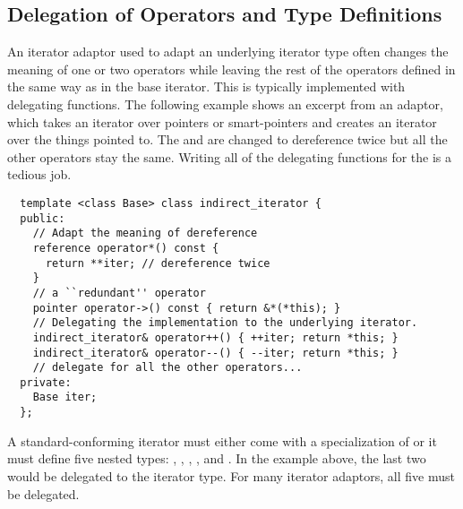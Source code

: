 \documentclass{netobjectdays}
\begin{document}
 


\subsection{Delegation of Operators and Type Definitions}

An iterator adaptor used to adapt an underlying iterator type often
changes the meaning of one or two operators while leaving the rest of
the operators defined in the same way as in the base iterator.  This
is typically implemented with delegating functions. The following
example shows an excerpt from an  adaptor,
which takes an iterator over pointers or smart-pointers and creates an
iterator over the things pointed to. The  and
 are changed to dereference twice but all the other
operators stay the same. Writing all of the delegating functions for
the  is a tedious job.

{\footnotesize
\begin{verbatim}
  template <class Base> class indirect_iterator {
  public:
    // Adapt the meaning of dereference
    reference operator*() const {
      return **iter; // dereference twice
    }
    // a ``redundant'' operator
    pointer operator->() const { return &*(*this); }
    // Delegating the implementation to the underlying iterator.
    indirect_iterator& operator++() { ++iter; return *this; }
    indirect_iterator& operator--() { --iter; return *this; }
    // delegate for all the other operators...
  private:
    Base iter;
  };
\end{verbatim}
}

A standard-conforming iterator must either come with a specialization
of  or it must define five nested
types: , , ,
, and . In the
example above, the last two would be delegated to the 
iterator type. For many iterator adaptors, all five must be delegated.
\end{document}
